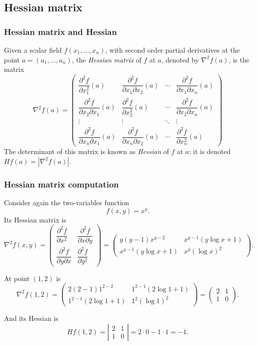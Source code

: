 \subsection{Hessian matrix}
\begin{frame}
\frametitle{Hessian matrix and Hessian}
\begin{definition}
Given a scalar field $f(x_1,\ldots,x_n)$, with second order partial derivatives at the point $a=(a_1,\ldots,a_n)$, the \emph{Hessian matrix} of $f$ at $a$, denoted by $\nabla^2f(a)$, is the matrix
\[
\nabla^2f(a)=\left(
\begin{array}{cccc}
\dfrac{\partial^2 f}{\partial x_1^2}(a) &
\dfrac{\partial^2 f}{\partial x_1 \partial x_2}(a) &
\cdots &
\dfrac{\partial^2 f}{\partial x_1 \partial x_n}(a)\\
\dfrac{\partial^2 f}{\partial x_2 \partial x_1}(a) &
\dfrac{\partial^2 f}{\partial x_2^2}(a) &
\cdots &
\dfrac{\partial^2 f}{\partial x_2 \partial x_n}(a)\\
\vdots & \vdots & \ddots & \vdots \\
\dfrac{\partial^2 f}{\partial x_n \partial x_1}(a) &
\dfrac{\partial^2 f}{\partial x_n \partial x_2}(a) &
\cdots &
\dfrac{\partial^2 f}{\partial x_n^2}(a)
\end{array}
\right)
\]
The determinant of this matrix is known as \emph{Hessian} of $f$ at $a$; it is denoted $Hf(a)=|\nabla^2f(a)|$.
\end{definition}
\end{frame}


\begin{frame}
\frametitle{Hessian matrix computation}
Consider again the two-variables function
\[f(x,y)=x^y.\]
Its Hessian matrix is
\[
\nabla^2f(x,y)=\left(
\begin{array}{cc}
\dfrac{\partial^2 f}{\partial x^2} & \dfrac{\partial^2 f}{\partial x \partial y}\\
\dfrac{\partial^2 f}{\partial y \partial x} & \dfrac{\partial^2 f}{\partial y^2}
\end{array}
\right)
=
\left(
\begin{array}{cc}
y(y-1)x^{y-2} & x^{y-1}(y\log x+1) \\
x^{y-1}(y\log x+1) & x^y(\log x)^2
\end{array}
\right).
\]

At point $(1,2)$ is
\[
\nabla^2f(1,2)=\left(
\begin{array}{cc}
2(2-1)1^{2-2} & 1^{2-1}(2\log 1+1) \\
1^{2-1}(2\log 1+1) & 1^2(\log 1)^2
\end{array}
\right)
=
\left(
\begin{array}{cc}
2 & 1 \\
1 & 0
\end{array}
\right).
\]

And its Hessian is
\[
Hf(1,2)=\left|
\begin{array}{cc}
2 & 1 \\
1 & 0
\end{array}
\right|=
2\cdot 0-1\cdot1= -1.
\]
\end{frame}


